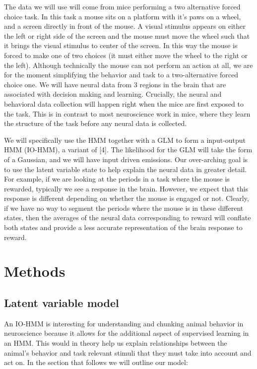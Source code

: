 \documentclass{article}
\begin{document}
\noindent
The data we will use will come from mice performing a two alternative forced choice task. In this task a mouse sits on a platform with it's paws on a wheel, and a screen directly in front of the mouse. A visual stimulus appears on either the left or right side of the screen and the mouse must move the wheel such that it brings the visual stimulus to center of the screen. In this way the mouse is forced to make one of two choices (it must either move the wheel to the right or the left). Although technically the mouse can not perform an action at all, we are for the moment simplifying the behavior and task to a two-alternative forced choice one. We will have neural data from 3 regions in the brain that are associated with decision making and learning. Crucially, the neural and behavioral data collection will happen right when the mice are first exposed to the task. This is in contrast to most neuroscience work in mice, where they learn the structure of the task before any neural data is collected. 

\noindent
We will specifically use the HMM together with a GLM to form a input-output HMM (IO-HMM), a variant of [4]. The likelihood for the GLM will take the form of a Gaussian, and we will have input driven emissions. Our over-arching goal is to use the latent variable state to help explain the neural data in greater detail. For example, if we are looking at the periods in a task where the mouse is rewarded, typically we see a response in the brain. However, we expect that this response is different depending on whether the mouse is engaged or not. Clearly, if we have no way to segment the periods where the mouse is in these different states, then the averages of the neural data corresponding to reward will conflate both states and provide a less accurate representation of the brain response to reward. 

\section{Methods}
\subsection{Latent variable model}
An IO-HMM is interesting for understanding and chunking animal behavior in neuroscience because it allows for the additional aspect of supervised learning in an HMM. This would in theory help us explain relationships between the animal's behavior and task relevant stimuli that they must take into account and act on. In the section that follows we will outline our model: 
\end{document}
